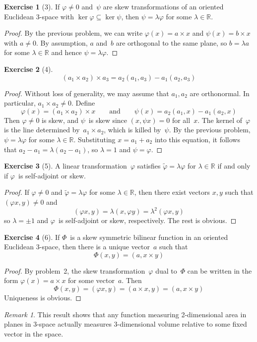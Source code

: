 \documentclass[letterpaper,12pt]{article}
\newcommand{\R}{\mathbb{R}}
\newcommand{\cross}{\times}
\newcommand{\iprod}[2]{(#1,#2)}
\newcommand{\adj}[1]{\widetilde{#1}}
\theoremstyle{definition}
\newtheorem*{exer}{Exercise}
\theoremstyle{remark}
\newtheorem*{rmk}{Remark}
\begin{document}
\begin{exer}[3]
If \(\varphi\ne 0\) and~\(\psi\) are skew transformations of an oriented Euclidean 3-space with \(\ker\varphi\subseteq\ker\psi\), then \(\psi=\lambda\varphi\) for some \(\lambda\in\R\).
\end{exer}
\begin{proof}
By the previous problem, we can write \(\varphi(x)=a\cross x\) and \(\psi(x)=b\cross x\) with \(a\ne 0\). By assumption, \(a\) and~\(b\) are orthogonal to the same plane, so \(b=\lambda a\) for some \(\lambda\in\R\) and hence \(\psi=\lambda\varphi\).
\end{proof}

\begin{exer}[4]
\[(a_1\cross a_2)\cross a_3=a_2(a_1,a_3)-a_1(a_2,a_3)\]
\end{exer}
\begin{proof}
Without loss of generality, we may assume that \(a_1,a_2\) are orthonormal. In particular, \(a_1\cross a_2\ne 0\). Define
\[\varphi(x)=(a_1\cross a_2)\cross x\qquad\text{and}\qquad\psi(x)=a_2(a_1,x)-a_1(a_2,x)\]
Then \(\varphi\ne 0\) is skew, and \(\psi\)~is skew since \(\iprod{x}{\psi x}=0\) for all~\(x\). The kernel of~\(\varphi\) is the line determined by~\(a_1\cross a_2\), which is killed by~\(\psi\). By the previous problem, \(\psi=\lambda\varphi\) for some \(\lambda\in\R\). Substituting \(x=a_1+a_2\) into this equation, it follows that \(a_2-a_1=\lambda(a_2-a_1)\), so \(\lambda=1\) and \(\psi=\varphi\).
\end{proof}

\begin{exer}[5]
A linear transformation~\(\varphi\) satisfies \(\adj{\varphi}=\lambda\varphi\) for \(\lambda\in\R\) if and only if \(\varphi\)~is self-adjoint or skew.
\end{exer}
\begin{proof}
If \(\varphi\ne 0\) and \(\adj{\varphi}=\lambda\varphi\) for some \(\lambda\in\R\), then there exist vectors \(x,y\) such that \(\iprod{\varphi x}{y}\ne 0\) and
\[\iprod{\varphi x}{y}=\lambda\iprod{x}{\varphi y}=\lambda^2\iprod{\varphi x}{y}\]
so \(\lambda=\pm 1\) and \(\varphi\)~is self-adjoint or skew, respectively. The rest is obvious.
\end{proof}

\begin{exer}[6]
If \(\Phi\)~is a skew symmetric bilinear function in an oriented Euclidean 3-space, then there is a unique vector~\(a\) such that
\[\Phi(x,y)=\iprod{a}{x\cross y}\]
\end{exer}
\begin{proof}
By problem~2, the skew transformation~\(\varphi\) dual to~\(\Phi\) can be written in the form \(\varphi(x)=a\cross x\) for some vector~\(a\). Then
\[\Phi(x,y)=\iprod{\varphi x}{y}=\iprod{a\cross x}{y}=\iprod{a}{x\cross y}\]
Uniqueness is obvious.
\end{proof}
\begin{rmk}
This result shows that any function measuring 2-dimensional area in planes in 3-space actually measures 3-dimensional volume relative to some fixed vector in the space.
\end{rmk}
\end{document}
